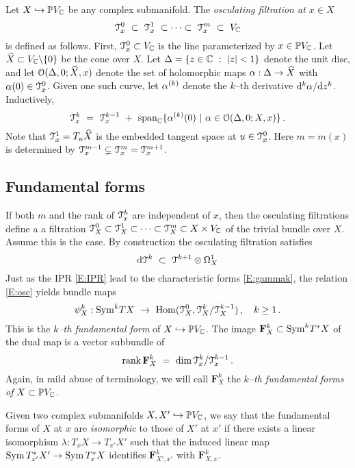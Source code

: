 \documentclass[12pt]{amsart}
\numberwithin{equation}{section}
\numberwithin{table}{section}
\numberwithin{figure}{section}
\begin{document}
Let $X \hookrightarrow \mathbb P V_\mathbb C$ be any complex submanifold.  The \emph{osculating filtration at $x \in X$} 
\[
  \mathcal T_x^0 \ \subset \ \mathcal T_x^1 \ \subset \cdots \subset \ \mathcal T_x^m 
  \ \subset \ V_\mathbb C
\]
is defined as follows.  First, $\mathcal T_x^0 \subset V_\mathbb C$ is the line parameterized by $x \in \mathbb P V_\mathbb C$.  Let $\widehat X \subset V_\mathbb C\backslash\{0\}$ be the cone over $X$.  Let $\Delta = \{ z \in \mathbb C \ : \ |z| < 1 \}$ denote the unit disc, and let $\mathcal O(\Delta,0;\widehat X,x)$ denote the set of holomorphic maps $\alpha : \Delta \to \widehat X$ with $\alpha(0) \in \mathcal T_x^0$.  Given one such curve, let $\alpha^{(k)}$ denote the $k$--th derivative $\mathrm{d}^k\alpha/\mathrm{d} z^k$.  Inductively,
\[
  \cT_x^k \ = \ \cT_x^{k-1} \ + \ 
  \tspan_\bC\{ \a^{(k)}(0) \ | \ \a \in \cO(\Delta,0;X,x) \} \,.
\]
Note that $\mathcal T_x^1 = T_u \widehat X$ is the embedded tangent space at $u \in \mathcal T_x^0$.  Here $m = m(x)$ is determined by $\mathcal T_x^{m-1} \subsetneq \mathcal T_x^m = \mathcal T_x^{m+1}$.  

\subsection{Fundamental forms} \label{S:F}

If both $m$ and the rank of $\mathcal T_x^k$ are independent of $x$, then the osculating filtrations define a a filtration $\mathcal T^0_X \subset \mathcal T^1_X \subset \cdots \subset \mathcal T^m_X \subset X \times V_\mathbb C$ of the trivial bundle over $X$.  Assume this is the case.  By construction the osculating filtration satisfies 
\begin{equation}\label{E:osc}
  \mathrm{d}\mathcal T^k \ \subset \ \mathcal T^{k+1} \otimes \Omega^1_X
\end{equation}
Just as the IPR \eqref{E:IPR} lead to the characteristic forms \eqref{E:gammak}, the relation \eqref{E:osc} yields bundle maps
\[
  \psi^k_X : \tSym^k TX \ \to \ \tHom(\cT^0_X , \cT^k_X/\cT^{k-1}_X) \,,\quad k \ge 1 \,.
\]
This is the \emph{$k$--th fundamental form} of $X \hookrightarrow \mathbb P V_\mathbb C$.  The image $\mathbf{F}^k_X \subset \mathrm{Sym}^k T^*X$ of the dual map is a vector subbundle of
\[
  \trank\,\mathbf{F}^k_X \ = \ \tdim\,\cT_x^k/\cT^{k-1}_x \,.
\]
Again, in mild abuse of terminology, we will call $\mathbf{F}^k_X$ the \emph{$k$--th fundamental forms of $X \subset \mathbb P V_\mathbb C$}.

Given two complex submanifolds $X,X' \hookrightarrow \mathbb P V_\mathbb C$, we say that the fundamental forms of $X$ at $x$ are \emph{isomorphic} to those of $X'$ at $x'$ if there exists a linear isomorphism $\lambda : T_xX \to T_{x'}X'$ such that the induced linear map $\mathrm{Sym}\,T^*_{x'}X' \to \mathrm{Sym}\,T^*_xX$ identifies $\mathbf{F}^k_{X',x'}$ with $\mathbf{F}^k_{X,x}$.
\end{document}
